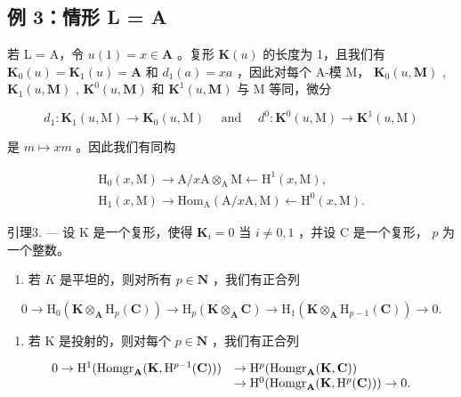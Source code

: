 \subsection{例 3：情形 L = A}

若 L = A，令 \(u(1) = x \in \mathbf{A}\) 。复形 \(\mathbf{K}(u)\) 的长度为 1，且我们有 \(\mathbf{K}_{0}(u) = \mathbf{K}_{1}(u) = \mathbf{A}\) 和 \(d_{1}(a) = xa\) ，因此对每个 A-模 M， \(\mathbf{K}_{0}(u, \mathbf{M})\) , \(\mathbf{K}_{1}(u, \mathbf{M})\) , \(\mathbf{K}^{0}(u, \mathbf{M})\) 和 \(\mathbf{K}^{1}(u, \mathbf{M})\) 与 M 等同，微分

\[
d _ {1}: \mathbf {K} _ {1} (u, \mathrm{M}) \rightarrow \mathbf {K} _ {0} (u, \mathrm{M}) \quad \text { and }\quad d ^ {0}: \mathbf {K} ^ {0} (u, \mathrm{M}) \rightarrow \mathbf {K} ^ {1} (u, \mathrm{M})
\]

是 \(m \mapsto xm\) 。因此我们有同构

\[
\begin{array}{l} \mathrm{H} _ {0} (x, \mathrm{M}) \to \mathrm{A} / x \mathrm{A} \otimes_ {\mathrm{A}} \mathrm{M} \leftarrow \mathrm{H} ^ {1} (x, \mathrm{M}), \\ \mathrm{H} _ {1} (x, \mathrm{M}) \to \mathrm{Hom} _ {\mathrm{A}} (\mathrm{A} / x \mathrm{A}, \mathrm{M}) \leftarrow \mathrm{H} ^ {0} (x, \mathrm{M}). \end{array}
\]

引理3. --- 设 K 是一个复形，使得 \(\mathbf{K}_i = 0\) 当 \(i \neq 0, 1\) ，并设 C 是一个复形， \(p\) 为一个整数。

\begin{enumerate}
\def\labelenumi{\alph{enumi})}
\tightlist
\item
  若 \(K\) 是平坦的，则对所有 \(p \in \mathbf{N}\) ，我们有正合列
\end{enumerate}

\[
0 \rightarrow \mathrm{H} _ {0} (\mathbf {K} \otimes_ {\mathbf {A}} \mathrm{H} _ {p} (\mathbf {C})) \rightarrow \mathrm{H} _ {p} (\mathbf {K} \otimes_ {\mathbf {A}} \mathbf {C}) \rightarrow \mathrm{H} _ {1} (\mathbf {K} \otimes_ {\mathbf {A}} \mathrm{H} _ {p - 1} (\mathbf {C})) \rightarrow 0.
\]

\begin{enumerate}
\def\labelenumi{\alph{enumi})}
\setcounter{enumi}{1}
\tightlist
\item
  若 K 是投射的，则对每个 \(p \in \mathbf{N}\) ，我们有正合列
\end{enumerate}

\[
\begin{array}{r l} 0 \to \mathrm{H} ^ {1} (\operatorname{Homgr} _ {\mathbf {A}} (\mathbf {K}, \mathrm{H} ^ {p - 1} (\mathbf {C}))) & \to \mathrm{H} ^ {p} (\operatorname{Homgr} _ {\mathbf {A}} (\mathbf {K}, \mathbf {C})) \\ & \to \mathrm{H} ^ {0} (\operatorname{Homgr} _ {\mathbf {A}} (\mathbf {K}, \mathrm{H} ^ {p} (\mathbf {C}))) \to 0. \end{array}
\]

